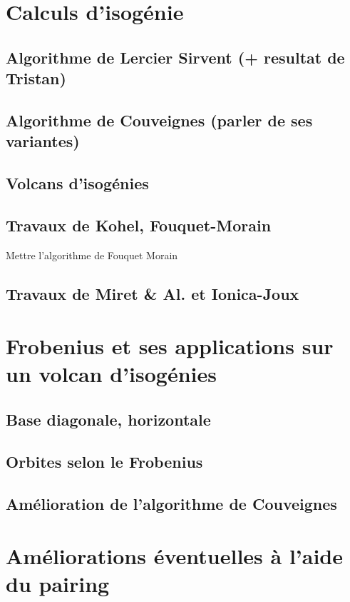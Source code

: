 \documentclass[10pt,a4paper]{book}
\theoremstyle{plain}
\theoremstyle{definition}
\theoremstyle{definition}
\theoremstyle{definition}
\theoremstyle{definition}
\theoremstyle{remark}
\theoremstyle{remark}
\begin{document}
\section{Calculs d'isogénie}
\subsection{Algorithme de Lercier Sirvent (+ resultat de Tristan)}
\subsection{Algorithme de Couveignes (parler de ses variantes)}

\subsection{Volcans d'isogénies}
\subsection{Travaux de Kohel, Fouquet-Morain}
Mettre l'algorithme de Fouquet Morain
\subsection{Travaux de Miret \& Al. et Ionica-Joux}


\section{Frobenius et ses applications sur un volcan d'isogénies}
\subsection{Base diagonale, horizontale}
\subsection{Orbites selon le Frobenius}
\subsection{Amélioration de l'algorithme de Couveignes}

\section{Améliorations éventuelles à l'aide du pairing}



\end{document}
